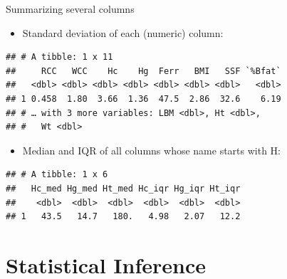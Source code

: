 \documentclass[ignorenonframetext,]{beamer}
\newenvironment{Shaded}{\begin{snugshade}}{\end{snugshade}}
\newcommand{\DataTypeTok}[1]{\textcolor[rgb]{0.13,0.29,0.53}{#1}}
\newcommand{\KeywordTok}[1]{\textcolor[rgb]{0.13,0.29,0.53}{\textbf{#1}}}
\newcommand{\NormalTok}[1]{#1}
\newcommand{\OperatorTok}[1]{\textcolor[rgb]{0.81,0.36,0.00}{\textbf{#1}}}
\newcommand{\StringTok}[1]{\textcolor[rgb]{0.31,0.60,0.02}{#1}}
\providecommand{\tightlist}{%
  \setlength{\itemsep}{0pt}\setlength{\parskip}{0pt}}
\begin{document}
\begin{frame}[fragile]{Summarizing several columns}
\protect\hypertarget{summarizing-several-columns}{}

\begin{itemize}
\tightlist
\item
  Standard deviation of each (numeric) column:
\end{itemize}

\begin{Shaded}
\end{Shaded}

\begin{verbatim}
## # A tibble: 1 x 11
##     RCC   WCC    Hc    Hg  Ferr   BMI   SSF `%Bfat`
##   <dbl> <dbl> <dbl> <dbl> <dbl> <dbl> <dbl>   <dbl>
## 1 0.458  1.80  3.66  1.36  47.5  2.86  32.6    6.19
## # … with 3 more variables: LBM <dbl>, Ht <dbl>,
## #   Wt <dbl>
\end{verbatim}

\begin{itemize}
\tightlist
\item
  Median and IQR of all columns whose name starts with H:
\end{itemize}

\begin{Shaded}
\end{Shaded}

\begin{verbatim}
## # A tibble: 1 x 6
##   Hc_med Hg_med Ht_med Hc_iqr Hg_iqr Ht_iqr
##    <dbl>  <dbl>  <dbl>  <dbl>  <dbl>  <dbl>
## 1   43.5   14.7   180.   4.98   2.07   12.2
\end{verbatim}

\end{frame}

\hypertarget{statistical-inference}{%
\section{Statistical Inference}\label{statistical-inference}}
\end{document}
